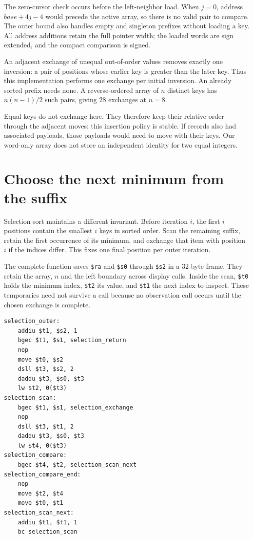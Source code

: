 The zero-cursor check occurs before the left-neighbor load. When $j=0$, address
$base+4j-4$ would precede the active array, so there is no valid pair to compare.
The outer bound also handles empty and singleton prefixes without loading a key.
All address additions retain the full pointer width; the loaded words are sign
extended, and the compact comparison is signed.

An adjacent exchange of unequal out-of-order values removes exactly one inversion:
a pair of positions whose earlier key is greater than the later key. Thus this
implementation performs one exchange per initial inversion. An already sorted
prefix needs none. A reverse-ordered array of $n$ distinct keys has
$n(n-1)/2$ such pairs, giving 28 exchanges at $n=8$.

Equal keys do not exchange here. They therefore keep their relative order through
the adjacent moves: this insertion policy is stable. If records also had associated
payloads, those payloads would need to move with their keys. Our word-only array
does not store an independent identity for two equal integers.

\section{Choose the next minimum from the suffix}

Selection sort maintains a different invariant. Before iteration $i$, the first
$i$ positions contain the smallest $i$ keys in sorted order. Scan the remaining
suffix, retain the first occurrence of its minimum, and exchange that item with
position $i$ if the indices differ. This fixes one final position per outer iteration.

The complete function saves \texttt{\$ra} and \texttt{\$s0} through \texttt{\$s2}
in a 32-byte frame. They retain the array, $n$ and the left boundary across display
calls. Inside the scan, \texttt{\$t0} holds the minimum index, \texttt{\$t2} its
value, and \texttt{\$t1} the next index to inspect. These temporaries need not
survive a call because no observation call occurs until the chosen exchange is
complete.

\noindent\begin{minipage}{\linewidth}
  \begin{verbatim}
selection_outer:
    addiu $t1, $s2, 1
    bgec $t1, $s1, selection_return
    nop
    move $t0, $s2
    dsll $t3, $s2, 2
    daddu $t3, $s0, $t3
    lw $t2, 0($t3)
selection_scan:
    bgec $t1, $s1, selection_exchange
    nop
    dsll $t3, $t1, 2
    daddu $t3, $s0, $t3
    lw $t4, 0($t3)
selection_compare:
    bgec $t4, $t2, selection_scan_next
selection_compare_end:
    nop
    move $t2, $t4
    move $t0, $t1
selection_scan_next:
    addiu $t1, $t1, 1
    bc selection_scan
\end{verbatim}
\end{minipage}

